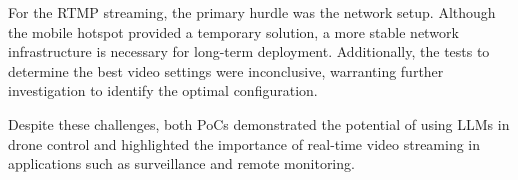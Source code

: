 For the \ac{RTMP} streaming, the primary hurdle was the network setup. Although the mobile hotspot provided a temporary solution, a more stable network infrastructure is necessary for long-term deployment. 
Additionally, the tests to determine the best video settings were inconclusive, warranting further investigation to identify the optimal configuration.

Despite these challenges, 
both \acp{PoC} demonstrated the potential of using \acp{LLM} in drone control and highlighted the importance of real-time video streaming in applications such as surveillance and remote monitoring.
